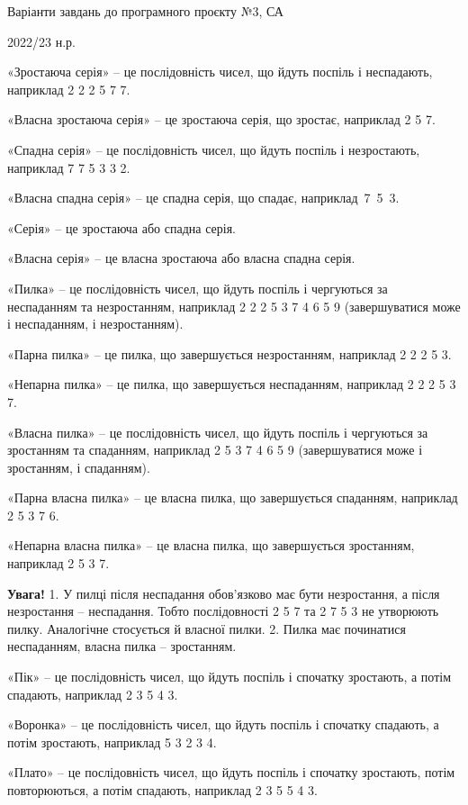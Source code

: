 \documentclass[11pt, ukrainian]{article}
\begin{document}
{\Large \center  Варіанти завдань до програмного проєкту №3, СА\par 2022/23 н.р.\par \bigskip\bigskip}

«Зростаюча серія» – це послідовність чисел, що йдуть поспіль і неспадають, наприклад 2 2 2 5 7 7.

«Власна зростаюча серія» – це зростаюча серія, що зростає, наприклад 2  5  7.

«Спадна серія» – це послідовність чисел, що йдуть поспіль і незростають, наприклад 7 7 5 3 3 2.

«Власна спадна серія» – це спадна серія, що спадає, наприклад~7~5~3.

«Серія» – це зростаюча або спадна серія.

«Власна серія» – це власна зростаюча або власна спадна серія.

«Пилка» – це послідовність чисел, що йдуть поспіль і чергуються за неспаданням та незростанням, наприклад 2 2 2 5 3 7 4 6 5 9 (завершуватися може і неспаданням, і незростанням).

«Парна пилка» – це пилка, що завершується незростанням, наприклад 2 2 2 5 3.

«Непарна пилка» – це пилка, що завершується неспаданням, наприклад 2 2 2 5 3 7.

«Власна пилка» – це послідовність чисел, що йдуть поспіль і чергуються за зростанням та спаданням, наприклад 2 5 3 7 4 6 5 9 (завершуватися може і зростанням, і спаданням).

«Парна власна пилка» – це власна пилка, що завершується спаданням, наприклад 2 5 3 7 6.

«Непарна власна пилка» – це власна пилка, що завершується зростанням, наприклад 2 5 3 7.

\textbf{Увага!} 1. У пилці після неспадання обов’язково має бути незростання, а після незростання  – неспадання. Тобто послідовності 2 5 7 та 2 7 5 3 не утворюють пилку. Аналогічне стосується й власної пилки. 2. Пилка має починатися неспаданням, власна пилка – зростанням.

«Пік» – це послідовність чисел, що йдуть поспіль і спочатку зростають, а потім спадають, наприклад 2 3 5 4 3. 

«Воронка» – це послідовність чисел, що йдуть поспіль і спочатку спадають, а потім зростають, наприклад 5 3 2 3 4.

«Плато» – це послідовність чисел, що йдуть поспіль і спочатку зростають, потім повторюються, а потім спадають, наприклад 2 3 5 5 4 3.
\end{document}
